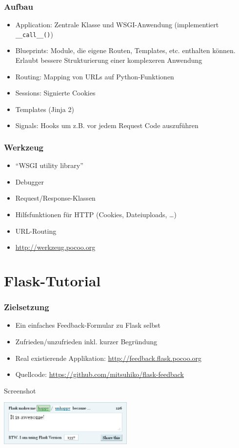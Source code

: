 \documentclass{beamer}
\begin{document}
\begin{frame}
  \frametitle{Aufbau}
  \begin{itemize}
    \item Application: Zentrale Klasse und WSGI-Anwendung (implementiert \lstinline{__call__()})
    \item Blueprints: Module, die eigene Routen, Templates, etc. enthalten können. Erlaubt bessere
          Strukturierung einer komplexeren Anwendung
    \item Routing: Mapping von URLs auf Python-Funktionen
    \item Sessions: Signierte Cookies
    \item Templates (Jinja 2)
    \item Signals: Hooks um z.B. vor jedem Request Code auszuführen
  \end{itemize}
\end{frame}

\begin{frame}
  \frametitle{Werkzeug}
  \begin{itemize}
    \item \enquote{WSGI utility library}
    \item Debugger
    \item Request/Response-Klassen
    \item Hilfsfunktionen für HTTP (Cookies, Dateiuploads, \ldots)
    \item URL-Routing
    \item \url{http://werkzeug.pocoo.org}
  \end{itemize}
\end{frame}

\section{Flask-Tutorial}

\begin{frame}
  \frametitle{Zielsetzung}
  \begin{itemize}
    \item Ein einfaches Feedback-Formular zu Flask selbst
    \item Zufrieden/unzufrieden inkl. kurzer Begründung
    \item Real existierende Applikation: \url{http://feedback.flask.pocoo.org}
    \item Quellcode: \url{https://github.com/mitsuhiko/flask-feedback}
  \end{itemize}

  \begin{exampleblock}{Screenshot}
    \begin{center}
      \includegraphics[width=0.5\textwidth]{images/flask-feedback.png}
    \end{center}
  \end{exampleblock}
\end{frame}
\end{document}
